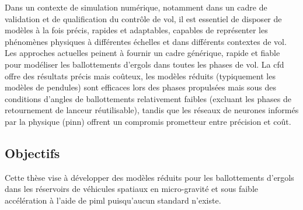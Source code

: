 \documentclass[12pt]{article}
\begin{document}
	Dans un contexte de simulation numérique, notamment dans un cadre de validation et de qualification du contrôle de vol, il est essentiel de disposer de modèles à la fois précis, rapides et adaptables, capables de représenter les phénomènes physiques à différentes échelles et dans différents contextes de vol.
	Les approches actuelles peinent à fournir un cadre générique, rapide et fiable pour modéliser les ballottements d’ergols dans toutes les phases de vol. La \acrshort{cfd} offre des résultats précis mais coûteux, les modèles réduits (typiquement les modèles de pendules) sont efficaces lors des phases propulsées mais sous des conditions d'angles de ballottements relativement faibles (excluant les phases de retournement de lanceur réutilisable), tandis que les réseaux de neurones informés par la physique (\gls{pinn}) offrent un compromis prometteur entre précision et coût.
	
	\subsection*{Objectifs}
	
	Cette thèse vise à développer des modèles réduits pour les ballottements d'ergols dans les réservoirs de véhicules spatiaux en micro-gravité et sous faible accélération à l'aide de \acrfull{piml} puisqu'aucun standard n'existe.
	
\end{document}
